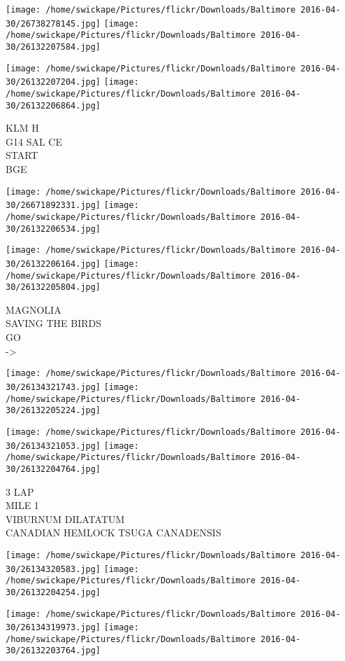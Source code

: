 \documentclass[10pt,letterpaper]{article}
\begin{document}
\texttt{[image: /home/swickape/Pictures/flickr/Downloads/Baltimore 2016-04-30/26738278145.jpg]}
\texttt{[image: /home/swickape/Pictures/flickr/Downloads/Baltimore 2016-04-30/26132207584.jpg]}

\texttt{[image: /home/swickape/Pictures/flickr/Downloads/Baltimore 2016-04-30/26132207204.jpg]}
\texttt{[image: /home/swickape/Pictures/flickr/Downloads/Baltimore 2016-04-30/26132206864.jpg]}

KLM H\\
G14 SAL CE\\
START\\
BGE
\pagebreak

\texttt{[image: /home/swickape/Pictures/flickr/Downloads/Baltimore 2016-04-30/26671892331.jpg]}
\texttt{[image: /home/swickape/Pictures/flickr/Downloads/Baltimore 2016-04-30/26132206534.jpg]}

\texttt{[image: /home/swickape/Pictures/flickr/Downloads/Baltimore 2016-04-30/26132206164.jpg]}
\texttt{[image: /home/swickape/Pictures/flickr/Downloads/Baltimore 2016-04-30/26132205804.jpg]}

MAGNOLIA\\
SAVING THE BIRDS\\
GO\\
{-}>
\pagebreak

\texttt{[image: /home/swickape/Pictures/flickr/Downloads/Baltimore 2016-04-30/26134321743.jpg]}
\texttt{[image: /home/swickape/Pictures/flickr/Downloads/Baltimore 2016-04-30/26132205224.jpg]}

\texttt{[image: /home/swickape/Pictures/flickr/Downloads/Baltimore 2016-04-30/26134321053.jpg]}
\texttt{[image: /home/swickape/Pictures/flickr/Downloads/Baltimore 2016-04-30/26132204764.jpg]}

3 LAP\\
MILE 1\\
VIBURNUM DILATATUM\\
CANADIAN HEMLOCK TSUGA CANADENSIS
\pagebreak

\texttt{[image: /home/swickape/Pictures/flickr/Downloads/Baltimore 2016-04-30/26134320583.jpg]}
\texttt{[image: /home/swickape/Pictures/flickr/Downloads/Baltimore 2016-04-30/26132204254.jpg]}

\texttt{[image: /home/swickape/Pictures/flickr/Downloads/Baltimore 2016-04-30/26134319973.jpg]}
\texttt{[image: /home/swickape/Pictures/flickr/Downloads/Baltimore 2016-04-30/26132203764.jpg]}
\end{document}
